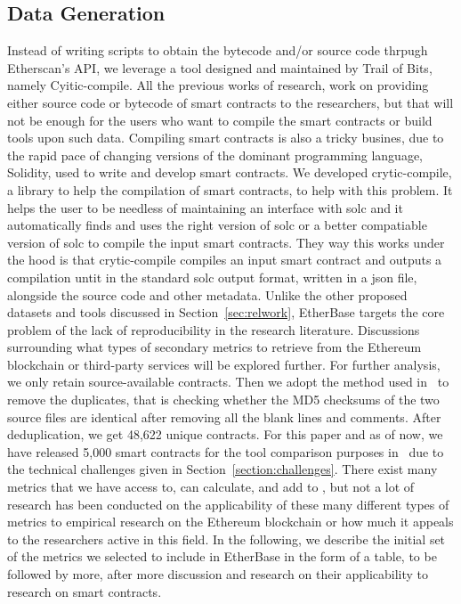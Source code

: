 	\subsection{Data Generation}
		Instead of writing scripts to obtain the bytecode and/or source code thrpugh Etherscan's API, we leverage a tool designed and maintained by Trail of Bits, namely Cyitic-compile.
		All the previous works of research, work on providing either source code or bytecode of smart contracts to the researchers, but that will not be enough for the users who want to compile the smart contracts or build tools upon such data.
		Compiling smart contracts is also a tricky busines, due to the rapid pace of changing versions of the dominant programming language, Solidity, used to write and develop smart contracts.
		We developed crytic-compile, a library to help the compilation of smart contracts, to help with this problem.
		It helps the user to be needless of maintaining an interface with solc and it automatically finds and uses the right version of solc or a better compatiable version of solc to compile the input smart contracts.
		They way this works under the hood is that crytic-compile compiles an input smart contract and outputs a compilation untit in the standard solc output format, written in a json file, alongside the source code and other metadata.
		Unlike the other proposed datasets and tools discussed in Section~\ref{sec:relwork}, EtherBase targets the core problem of the lack of reproducibility in the research literature.
		Discussions surrounding what types of secondary metrics to retrieve from the Ethereum blockchain or third-party services will be explored further.
		For further analysis, we only retain source-available contracts.
		Then we adopt the method used in~\cite{deduplicate} to remove the duplicates, that is checking whether the MD5 checksums of the two source files are identical after removing all the blank lines and comments.
		After deduplication, we get 48,622 unique contracts.
		For this paper and as of now, we have released 5,000 smart contracts for the tool comparison purposes in \etherbase~due to the technical challenges given in Section~\ref{section:challenges}.
		There exist many metrics that we have access to, can calculate, and add to \etherbase, but not a lot of research has been conducted on the applicability of these many different types of metrics to empirical research on the Ethereum blockchain or how much it appeals to the researchers active in this field.
		In the following, we describe the initial set of the metrics we selected to include in EtherBase in the form of a table, to be followed by more, after more discussion and research on their applicability to research on smart contracts.

